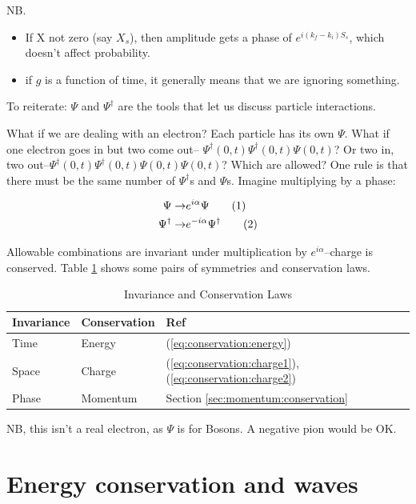 \documentclass[]{article}
\newcommand\numberthis{\addtocounter{equation}{1}\tag{\theequation}}
\begin{document}
NB.\begin{itemize}
	\item  If X not zero (say $X_s$), then amplitude gets a phase of $e^{i(k_f-k_i)S_s}$, which doesn't affect probability.
	\item if $g$ is a function of time, it generally means that we are ignoring something.
\end{itemize}

To reiterate: $\Psi$ and $\Psi^\dagger$ are the tools that let us discuss particle interactions.

What if we are dealing with an electron? Each particle has its own $\Psi$. What if one electron goes in but two come out-- $\Psi^\dagger(0,t)\Psi^\dagger(0,t)\Psi(0,t)$? Or two in, two out--$\Psi^\dagger(0,t)\Psi^\dagger(0,t)\Psi(0,t)\Psi(0,t)$? Which are allowed? One rule is that there must be the same number of $\Psi^\dagger$s and $\Psi$s. Imagine multiplying by a phase:

\begin{align*}
\Psi \rightarrow & e^{i\alpha} \Psi \numberthis \label{eq:conservation:charge1}\\
\Psi^\dagger \rightarrow & e^{-i\alpha} \Psi^\dagger \numberthis \label{eq:conservation:charge2}
\end{align*}

Allowable combinations are invariant under multiplication by $e^{i\alpha}$--charge is conserved. Table \ref{table:conserve} shows some pairs of symmetries and conservation laws.

\begin{table}[H]
	\caption{Invariance and Conservation Laws}\label{table:conserve}
	\begin{center}
			\begin{tabular}{|l|l|l|}  \hline
				Invariance&Conservation&Ref\\ \hline
				Time& Energy&(\ref{eq:conservation:energy})\\  \hline
				Space&Charge&(\ref{eq:conservation:charge1}),  (\ref{eq:conservation:charge2})\\ \hline
				Phase&Momentum&Section \ref{sec:momentum:conservation}\\ \hline
			\end{tabular}
	\end{center}
\end{table}

NB, this isn't a real electron, as $\Psi$ is for Bosons. A negative pion would be OK.


\section{Energy conservation and waves}\label{sec:energy:conservation}
\end{document}
